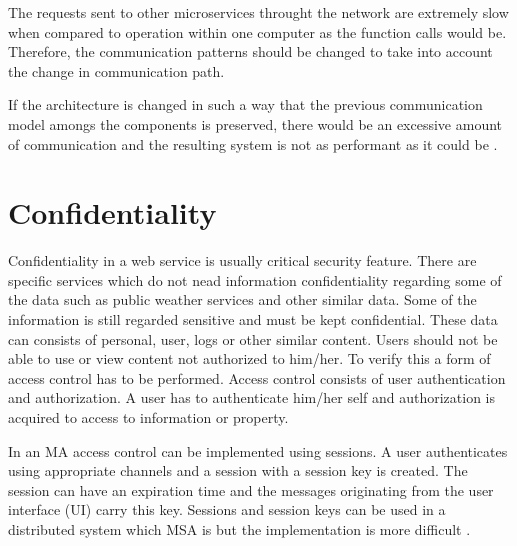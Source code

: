 \begin{sloppypar}
    The requests sent to other microservices throught the network are extremely 
    slow when compared to operation within one computer as the function calls 
    would be. Therefore, the communication patterns should be changed to take 
    into account the change in communication path.
\end{sloppypar}

\begin{sloppypar}
    If the architecture is changed in such a way that the previous communication 
    model amongs the components is preserved, there would be an excessive amount 
    of communication and the resulting system is not as performant as it could 
    be \citep{fowlerlewisms}.
\end{sloppypar}



\section{Confidentiality}
\begin{sloppypar}
    Confidentiality in a web service is usually critical security feature. 
    There are specific services which do not nead information confidentiality 
    regarding some of the data such as public weather services and other similar data.
    Some of the information is still regarded sensitive and must be kept confidential. 
    These data can consists of personal, user, logs or other similar content.
    Users should not be able to use or view content not authorized to him/her. 
    To verify this a form of access control has to be performed. Access control 
    consists of user authentication and authorization. A user has to 
    authenticate him/her self and authorization is acquired to access to 
    information or property.
\end{sloppypar}

\begin{sloppypar}
    In an MA access control can be implemented using sessions. 
    A user authenticates using appropriate channels and a session with a session key is created. 
    The session can have an expiration time and the messages originating from 
    the user interface (UI) carry this key. Sessions and session keys can be used 
    in a distributed system which MSA is but the implementation is more difficult \citep{authinmsa}.
\end{sloppypar}

